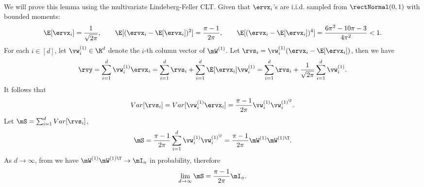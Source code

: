 \begin{proofof}{}
We will prove this lemma using the multivariate Lindeberg-Feller CLT.
Given that $\ervx_i$'s are i.i.d. sampled from $\rectNormal(0,1)$ with bounded moments:
\begin{equation}
     \E[\ervx_i] = \frac{1}{\sqrt{2\pi}},\qquad \E[(\ervx_i - \E[\ervx_i])^2] = \frac{\pi-1}{2\pi},\qquad \E[(\ervx_i - \E[\ervx_i])^4] = \frac{6\pi^2-10\pi-3}{4\pi^2} < 1.
\end{equation}
For each $i\in[d]$, let $\vw_i^{(1)}\in\R^d$ denote the $i$-th column vector of $\mW^{(1)}$. Let 
$\rvs_i = \vw_i^{(1)}(\ervx_i - \E[\ervx_i])$,
then we have \begin{equation}
\label{eqn:z-expression-w1}
    \rvy = \sum_{i=1}^d\vw_i^{(1)}\ervx_i = \sum_{i=1}^d\rvs_i + \sum_{i=1}^d\E[\ervx_i]\vw_i^{(1)} = \sum_{i=1}^d\rvs_i + \frac{1}{\sqrt{2\pi}}\sum_{i=1}^d\vw_i^{(1)}.
\end{equation}
It follows that 
\begin{equation}
   Var[\rvs_i] = Var[\vw_i^{(1)}\ervx_i] = \frac{\pi-1}{2\pi}\vw_i^{(1)}\vw_i^{(1)^\T}.
\end{equation}
Let $\mS = \sum_{i=1}^d Var[\rvs_i]$,
\begin{equation}
    \mS = \frac{\pi-1}{2\pi}\sum_{i=1}^d\vw_i^{(1)}\vw_i^{(1)^\T} = \frac{\pi-1}{2\pi}\mW^{(1)}\mW^{(1)\T}.
\end{equation}
As $d\to\infty$, from  we have $\mW^{(1)}\mW^{(1)\T}\to \mI_n$ in probability, therefore
\begin{equation}
\lim_{d\to\infty}\mS = \frac{\pi-1}{2\pi}\mI_n.
\end{equation}


\end{proofof}
